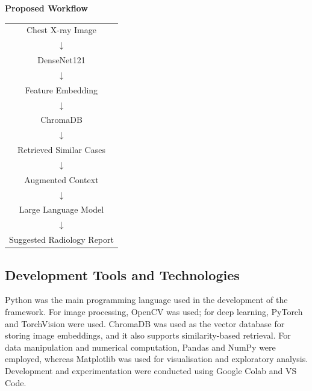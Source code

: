 \vspace{0.5em}
\noindent\textbf{Proposed Workflow}

\begin{center}
\begin{tabular}{c}
    Chest X-ray Image \\
    $\downarrow$ \\
    DenseNet121 \\
    $\downarrow$ \\
    Feature Embedding \\
    $\downarrow$ \\
    ChromaDB \\
    $\downarrow$ \\
    Retrieved Similar Cases \\
    $\downarrow$ \\
    Augmented Context \\
    $\downarrow$ \\
    Large Language Model \\
    $\downarrow$ \\
    Suggested Radiology Report \\
\end{tabular}
\end{center}

\subsection{Development Tools and Technologies}

Python was the main programming language used in the development of the framework. For
image processing, OpenCV was used; for deep learning, PyTorch and TorchVision were used.
ChromaDB was used as the vector database for storing image embeddings, and it also supports
similarity-based retrieval. For data manipulation and numerical computation, Pandas and NumPy
were employed, whereas Matplotlib was used for visualisation and exploratory analysis.
Development and experimentation were conducted using Google Colab and VS Code.

